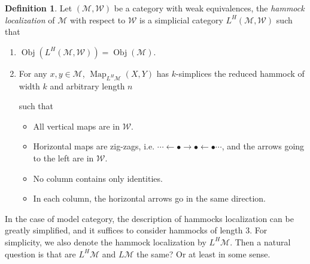 \documentclass[12pt]{amsart}
\theoremstyle{definition}
\newtheorem{defn}[thm]{Definition}
\theoremstyle{remark}
\numberwithin{equation}{section}
\newcommand{\cm}{{\mathcal{M}}}
\newcommand{\CW}{{\mathcal{W}}}
\newcommand{\1}{{\mathbb{1}}}
\newcommand{\ob}{\operatorname{Obj}}
\newcommand{\map}{\operatorname{Map}}
\begin{document}
\begin{defn}
	Let $(\cm, \CW)$ be a category with weak equivalences, the {\it hammock localization} of $\cm$ with respect to $\CW$ is a simplicial category $L^H(\cm, \CW)$ such that
		\begin{enumerate}
			\item $\ob (L^H(\cm, \CW))=\ob(\cm)$.
			\item For any $x, y \in \cm$, $\map_{L^H\cm} (X,Y)$ has $k$-simplices the reduced hammock of width $k$ and arbitrary length $n$
		\begin{center}
			\end{center}
			such that
			\begin{itemize}
				\item All vertical maps are in $\CW$.
				\item Horizontal maps are zig-zags, i.e. $\cdots \leftarrow \bullet\rightarrow \bullet \leftarrow \bullet \cdots$, and the arrows going to the left are in $\CW$.
				\item No column contains only identities.
				\item In each column, the horizontal arrows go in the same direction. 
			\end{itemize}
		
		\end{enumerate}
	In the case of model category, the description of hammocks localization can be greatly simplified, and it suffices to consider hammocks of length 3. For simplicity, we also denote the hammock localization by $L^H\cm$. Then a natural question is that are $L^H\cm$ and $L\cm$ the same? Or at least in some sense. 
	

\end{defn}
\end{document}
